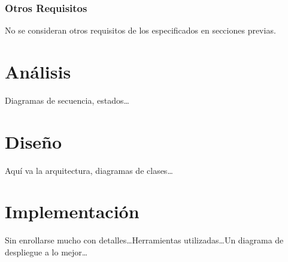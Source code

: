 \subsubsection{Otros Requisitos}

No se consideran otros requisitos de los especificados en secciones previas.


\section{Análisis}

Diagramas de secuencia, estados\dots


\section{Diseño}

Aquí va la arquitectura, diagramas de clases\dots


\section{Implementación}

Sin enrollarse mucho con detalles\dots Herramientas utilizadas\dots Un diagrama de despliegue a lo mejor\dots